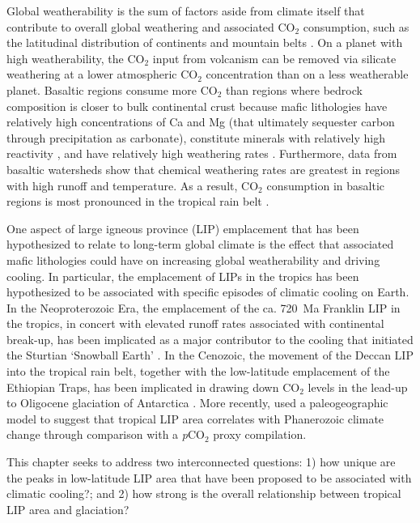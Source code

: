 \documentclass[11pt,letterpaper]{article}
\begin{document}
Global weatherability is the sum of factors aside from climate itself that contribute to overall global weathering and associated CO$_2$ consumption, such as the latitudinal distribution of continents and mountain belts \citep{Kump1997a}. On a planet with high weatherability, the CO$_2$ input from volcanism can be removed via silicate weathering at a lower atmospheric CO$_2$ concentration than on a less weatherable planet. Basaltic regions consume more CO$_2$ than regions where bedrock composition is closer to bulk continental crust because mafic lithologies have relatively high concentrations of Ca and Mg (that ultimately sequester carbon through precipitation as carbonate), constitute minerals with relatively high reactivity \citep{Gislason2003a}, and have relatively high weathering rates \citep{Dessert2003a, Ibarra2016a}. Furthermore, data from basaltic watersheds show that chemical weathering rates are greatest in regions with high runoff and temperature. As a result, CO$_2$ consumption in basaltic regions is most pronounced in the tropical rain belt \citep{Dessert2003a, Hartmann2009a, Hartmann2014a}.

One aspect of large igneous province (LIP) emplacement that has been hypothesized to relate to long-term global climate is the effect that associated mafic lithologies could have on increasing global weatherability and driving cooling. In particular, the emplacement of LIPs in the tropics has been hypothesized to be associated with specific episodes of climatic cooling on Earth. In the Neoproterozoic Era, the emplacement of the ca. 720~Ma Franklin LIP in the tropics, in concert with elevated runoff rates associated with continental break-up, has been implicated as a major contributor to the cooling that initiated the Sturtian `Snowball Earth' \citep{Donnadieu2004b, Macdonald2010a, Cox2016a}. In the Cenozoic, the movement of the Deccan LIP into the tropical rain belt, together with the low-latitude emplacement of the Ethiopian Traps, has been implicated in drawing down CO$_2$ levels in the lead-up to Oligocene glaciation of Antarctica \citep{Kent2008a, Kent2013a}. More recently, \citet{Johansson2018a} used a paleogeographic model to suggest that tropical LIP area correlates with Phanerozoic climate change through comparison with a \textit{p}CO$_{2}$ proxy compilation.

This chapter seeks to address two interconnected questions: 1) how unique are the peaks in low-latitude LIP area that have been proposed to be associated with climatic cooling?; and 2) how strong is the overall relationship between tropical LIP area and glaciation?
\end{document}
